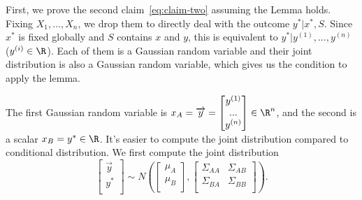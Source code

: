 
First, we prove the second claim~\eqref{eq:claim-two} assuming the Lemma holds. Fixing $X_1, ..., X_n$, we drop them to directly deal with the outcome $y^* | x^*, S$. Since $x^*$ is fixed globally and $S$ contains $x$ and $y$, this is equivalent to $y^* | y^{(1)}, ..., y^{(n)}$ ($y^{(i)} \in \R$). Each of them is a Gaussian random variable and their joint distribution is also a Gaussian random variable, which gives us the condition to apply the lemma. 

The first Gaussian random variable is $x_A = \overrightarrow{y} = 
\begin{bmatrix}
	y^{(1)} \\
	... \\
	y^{(n)}\\
\end{bmatrix}
\in \R^n$, and the second is a scalar $x_B = y^* \in \R$. It's easier to compute the joint distribution compared to conditional distribution. We first compute the joint distribution
\begin{equation*} \label{eu_eqn}
	\begin{bmatrix}
		\overrightarrow{y} \\
		y^* \\
	\end{bmatrix}
	\sim N(
	\begin{bmatrix}
		\mu_A \\
		\mu_B \\
	\end{bmatrix}
	,
	\begin{bmatrix}
		\Sigma_{AA} & \Sigma_{AB} \\
		\Sigma_{BA} & \Sigma_{BB} \\
	\end{bmatrix}
	).
\end{equation*}


